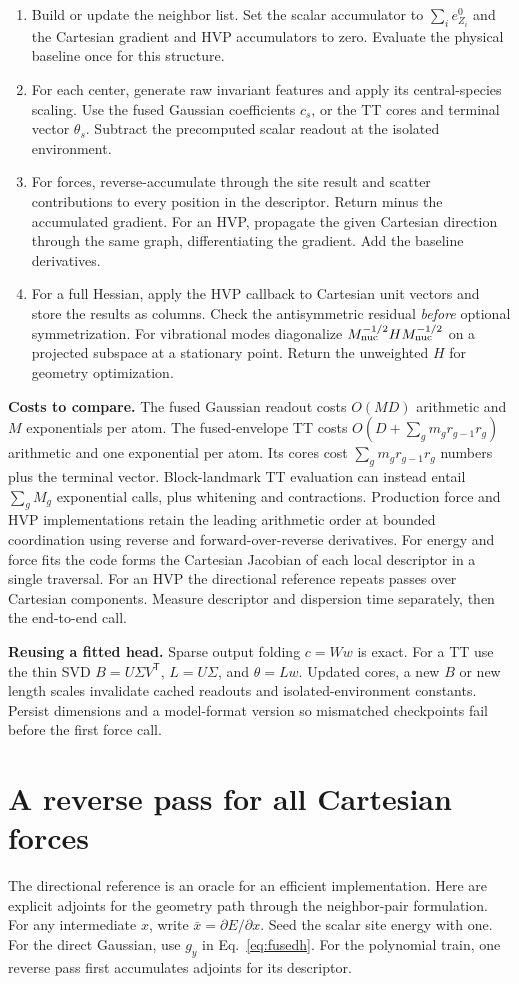 \documentclass[11pt,a4paper]{article}
\newcommand{\T}{\mathsf T}\newcommand{\tr}{\operatorname{tr}}
\begin{document}
\begin{enumerate}
\item Build or update the neighbor list. Set the scalar accumulator to $\sum_i e^0_{Z_i}$ and the Cartesian gradient and HVP accumulators to zero. Evaluate the physical baseline once for this structure.
\item For each center, generate raw invariant features and apply its central-species scaling. Use the fused Gaussian coefficients $c_s$, or the TT cores and terminal vector $\theta_s$. Subtract the precomputed scalar readout at the isolated environment.
\item For forces, reverse-accumulate through the site result and scatter contributions to every position in the descriptor. Return minus the accumulated gradient. For an HVP, propagate the given Cartesian direction through the same graph, differentiating the gradient. Add the baseline derivatives.
\item For a full Hessian, apply the HVP callback to Cartesian unit vectors and store the results as columns. Check the antisymmetric residual \emph{before} optional symmetrization. For vibrational modes diagonalize $M_{\rm nuc}^{-1/2}HM_{\rm nuc}^{-1/2}$ on a projected subspace at a stationary point. Return the unweighted $H$ for geometry optimization.
\end{enumerate}

\textbf{Costs to compare.} The fused Gaussian readout costs $O(MD)$ arithmetic and $M$ exponentials per atom. The fused-envelope TT costs $O(D+\sum_g m_g r_{g-1}r_g)$ arithmetic and one exponential per atom. Its cores cost $\sum_g m_gr_{g-1}r_g$ numbers plus the terminal vector. Block-landmark TT evaluation can instead entail $\sum_g M_g$ exponential calls, plus whitening and contractions. Production force and HVP implementations retain the leading arithmetic order at bounded coordination using reverse and forward-over-reverse derivatives. For energy and force fits the code forms the Cartesian Jacobian of each local descriptor in a single traversal. For an HVP the directional reference repeats passes over Cartesian components. Measure descriptor and dispersion time separately, then the end-to-end call.

\textbf{Reusing a fitted head.} Sparse output folding $c=Ww$ is exact. For a TT use the thin SVD $B=U\Sigma V^\T$, $L=U\Sigma$, and $\theta=Lw$. Updated cores, a new $B$ or new length scales invalidate cached readouts and isolated-environment constants. Persist dimensions and a model-format version so mismatched checkpoints fail before the first force call.
\pg\section{A reverse pass for all Cartesian forces}
The directional reference is an oracle for an efficient implementation. Here are explicit adjoints for the geometry path through the neighbor-pair formulation. For any intermediate $x$, write $\bar x=\partial E/\partial x$. Seed the scalar site energy with one. For the direct Gaussian, use $g_y$ in Eq.~\eqref{eq:fusedh}. For the polynomial train, one reverse pass first accumulates adjoints for its descriptor.
\end{document}
